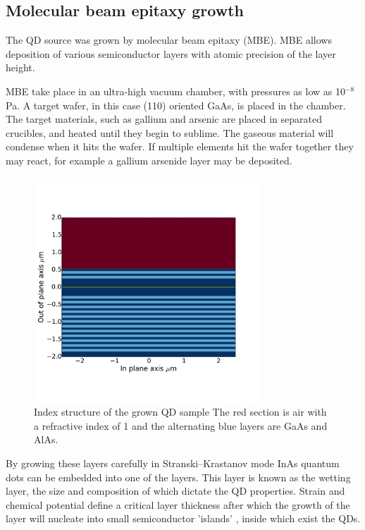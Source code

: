 \subsection{Molecular beam epitaxy growth}

The QD source was grown by molecular beam epitaxy (MBE)\cite{cho1975molecular}.
MBE allows deposition of various semiconductor layers with atomic precision of
the layer height.

MBE take place in an ultra-high vacuum chamber, with pressures as low as
10$^{-8}$ Pa. A target wafer, in this case (110) oriented GaAs, is placed in the
chamber. The target materials, such as gallium and arsenic are placed in
separated crucibles, and heated until they begin to sublime. The gaseous
material will condense when it hits the wafer. If multiple elements hit the
wafer together they may react, for example a gallium arsenide layer may be
deposited.

\begin{figure}[h!] \begin{center}
\includegraphics[width=0.75\textwidth]{images/qd_layers.pdf} \end{center}
\caption{
Index structure of the grown QD sample The red section is air with a
refractive index of 1 and the alternating blue layers are GaAs and AlAs.
}\label{fig:planar_cav} \end{figure}

By growing these layers carefully in Stranski–Krastanov mode InAs quantum dots
can be embedded into one of the layers. This layer is known as the wetting
layer, the size and composition of which dictate the QD
properties\cite{PhysRevB.70.125307}. Strain and chemical potential define a
critical layer thickness after which the growth of the layer will nucleate into
small semiconductor 'islands' \cite{PhysRevLett.64.1943}, inside which exist the
QDs.

